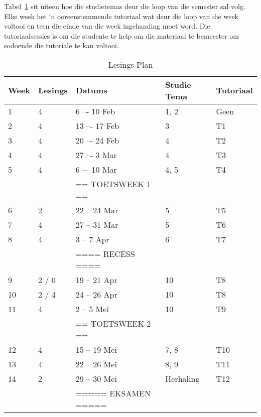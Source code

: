         Tabel~\ref{tab:lec_plan} sit uiteen hoe die studietemas deur die loop
        van die semester sal volg.  Elke week het `n ooreenstemmende tutoriaal
        wat deur die loop van die week voltooi en teen die	einde van die week
        ingehanding moet word. Die tutoriaalsessies is om die studente te help
        om die materiaal te bemeester om sodoende die tutoriale te kan voltooi.

        \begin{table}[!h]
            \begin{center}
             \begin{tabular}{|l|l|l|l|l|}
                 \hline
                 {\bf Week} & {\bf Lesings} & {\bf Datums} & {\bf Studie Tema}
                 & {\bf Tutoriaal} \\
                 \hline
                 1  & 4     &  6 –- 10 Feb      & 1, 2  & Geen \\
                 2  & 4     & 13 –- 17 Feb      & 3     & T1 \\
                 3  & 4     & 20 –- 24 Feb      & 4     & T2 \\
                 4  & 4     & 27 –-  3 Mar      & 4     & T3 \\
                 5  & 4     &  6 –- 10 Mar      & 4, 5  & T4 \\
                    &       & == TOETSWEEK 1 == &       & \\
                 6  & 2     & 22 -- 24 Mar      & 5     & T5 \\
                 7  & 4     & 27 -- 31 Mar      & 5     & T6 \\
                 8  & 4     &  3 --  7 Apr      & 6     & T7 \\
                    &       & ==== RECESS ====  &       & \\
                 9  & 2 / 0 & 19 -- 21 Apr      & 10    & T8 \\
                 10 & 2 / 4 & 24 -- 26 Apr      & 10    & T8 \\
                 11 & 4     &  2 --  5 Mei      & 10    & T9 \\
                    &       & == TOETSWEEK 2 == &       & \\
                 12 & 4     & 15 -- 19 Mei      & 7, 8  & T10 \\
                 13 & 4     & 22 -- 26 Mei      & 8, 9  & T11 \\
                 14 & 2     & 29 -- 30 Mei      & Herhaling & T12 \\
                    &       & ===== EKSAMEN ===== &       & \\
                 \hline
             \end{tabular}
             \caption{Lesings Plan} \label{tab:lec_plan}
            \end{center}
        \end{table}


